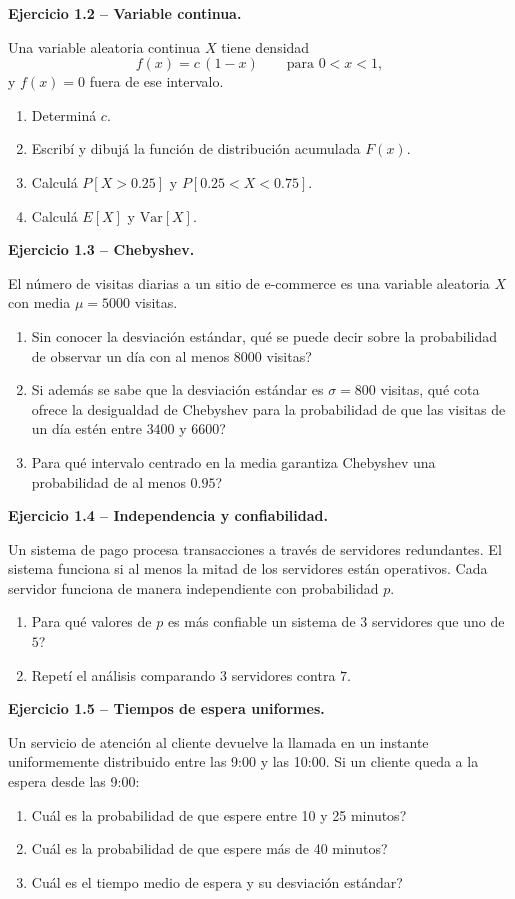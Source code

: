 \documentclass[11pt,a4paper]{article}
\newcommand{\ejercicio}[1]{\par\medskip\noindent\textbf{#1}\par\nopagebreak\smallskip}
\begin{document}
\ejercicio{Ejercicio 1.2 -- Variable continua.}
Una variable aleatoria continua $X$ tiene densidad
\[
f(x)=c\,(1-x)\qquad\text{para } 0<x<1,
\]
y $f(x)=0$ fuera de ese intervalo.
\begin{enumerate}[label=(\alph*)]
  \item Determin\'a $c$.
  \item Escrib\'i y dibuj\'a la funci\'on de distribuci\'on acumulada $F(x)$.
  \item Calcul\'a $P[X>0.25]$ y $P[0.25<X<0.75]$.
  \item Calcul\'a $E[X]$ y $\mathrm{Var}[X]$.
\end{enumerate}

\ejercicio{Ejercicio 1.3 -- Chebyshev.}
El n\'umero de visitas diarias a un sitio de e-commerce es una variable aleatoria
$X$ con media $\mu=5000$ visitas.
\begin{enumerate}[label=(\alph*)]
  \item Sin conocer la desviaci\'on est\'andar, \textquestiondown{}qu\'e se puede decir
        sobre la probabilidad de observar un d\'ia con al menos $8000$ visitas?
  \item Si adem\'as se sabe que la desviaci\'on est\'andar es $\sigma=800$ visitas,
        \textquestiondown{}qu\'e cota ofrece la desigualdad de Chebyshev para la probabilidad de que
        las visitas de un d\'ia est\'en entre $3400$ y $6600$?
  \item \textquestiondown{}Para qu\'e intervalo centrado en la media garantiza Chebyshev una
        probabilidad de al menos $0.95$?
\end{enumerate}

\ejercicio{Ejercicio 1.4 -- Independencia y confiabilidad.}
Un sistema de pago procesa transacciones a trav\'es de servidores redundantes.
El sistema funciona si al menos la mitad de los servidores est\'an operativos.
Cada servidor funciona de manera independiente con probabilidad $p$.
\begin{enumerate}[label=(\alph*)]
  \item \textquestiondown{}Para qu\'e valores de $p$ es m\'as confiable un sistema de $3$ servidores
        que uno de $5$?
  \item Repet\'i el an\'alisis comparando $3$ servidores contra $7$.
\end{enumerate}

\ejercicio{Ejercicio 1.5 -- Tiempos de espera uniformes.}
Un servicio de atenci\'on al cliente devuelve la llamada en un instante
uniformemente distribuido entre las 9:00 y las 10:00. Si un cliente queda a la
espera desde las 9:00:
\begin{enumerate}[label=(\alph*)]
  \item \textquestiondown{}Cu\'al es la probabilidad de que espere entre 10 y 25 minutos?
  \item \textquestiondown{}Cu\'al es la probabilidad de que espere m\'as de 40 minutos?
  \item \textquestiondown{}Cu\'al es el tiempo medio de espera y su desviaci\'on est\'andar?
\end{enumerate}
\end{document}
